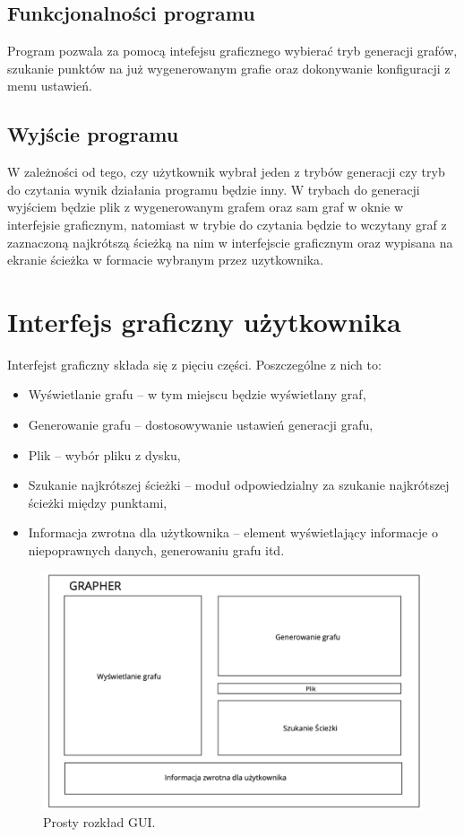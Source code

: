 \documentclass[10pt, a4paper]{report}
\begin{document}
    \subsection{Funkcjonalności programu}
    Program pozwala za pomocą intefejsu graficznego wybierać tryb generacji grafów, szukanie punktów na już wygenerowanym grafie oraz dokonywanie konfiguracji z menu ustawień.

    \subsection{Wyjście programu}
    W zależności od tego, czy użytkownik wybrał jeden z trybów generacji czy tryb do czytania wynik działania programu będzie inny.
    W trybach do generacji wyjściem będzie plik z wygenerowanym grafem oraz sam graf w oknie w interfejsie graficznym, natomiast w trybie do czytania będzie to wczytany graf z zaznaczoną najkrótszą ścieżką na nim w interfejscie graficznym oraz
    wypisana na ekranie ścieżka w formacie wybranym przez uzytkownika.
    \newpage

    \section{Interfejs graficzny użytkownika}
    Interfejst graficzny składa się z pięciu części. Poszczególne z nich to: 
    \begin{itemize}
      \item Wyświetlanie grafu -- w tym miejscu będzie wyświetlany graf,
      \item Generowanie grafu -- dostosowywanie ustawień generacji grafu,
      \item Plik -- wybór pliku z dysku,
      \item Szukanie najkrótszej ścieżki -- moduł odpowiedzialny za szukanie najkrótszej ścieżki między punktami,
      \item Informacja zwrotna dla użytkownika -- element wyświetlający informacje o niepoprawnych danych, generowaniu grafu itd.
    \end{itemize}
    \begin{figure}[ht]
      \begin{center}
          \includegraphics[scale=0.2]{gui_basic.jpg}
          \caption{Prosty rozkład GUI.}
      \end{center}
    \end{figure}
    \newpage
\end{document}
